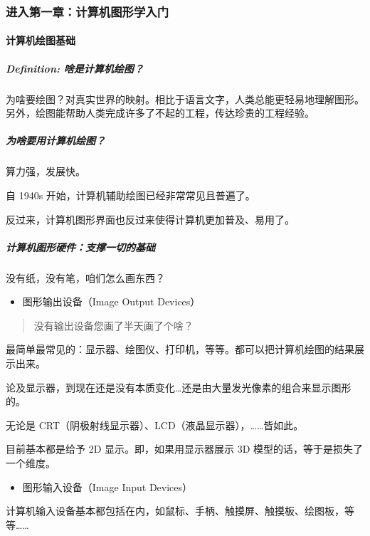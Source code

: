 \documentclass[
]{article}
\begin{document}
\hypertarget{header-n58}{%
\subsubsection{进入第一章：计算机图形学入门}\label{header-n58}}

\hypertarget{header-n59}{%
\paragraph{计算机绘图基础}\label{header-n59}}

\hypertarget{header-n60}{%
\subparagraph{Definition: 啥是计算机绘图？}\label{header-n60}}

为啥要绘图？对真实世界的映射。相比于语言文字，人类总能更轻易地理解图形。
另外，绘图能帮助人类完成许多了不起的工程，传达珍贵的工程经验。

\hypertarget{header-n62}{%
\subparagraph{为啥要用计算机绘图？}\label{header-n62}}

算力强，发展快。

自 1940s 开始，计算机辅助绘图已经非常常见且普遍了。

反过来，计算机图形界面也反过来使得计算机更加普及、易用了。

\hypertarget{header-n66}{%
\subparagraph{计算机图形硬件：支撑一切的基础}\label{header-n66}}

没有纸，没有笔，咱们怎么画东西？

\begin{itemize}
\item
  图形输出设备（Image Output Devices）
\end{itemize}

\begin{quote}
没有输出设备您画了半天画了个啥？
\end{quote}

最简单最常见的：显示器、绘图仪、打印机，等等。都可以把计算机绘图的结果展示出来。

论及显示器，到现在还是没有本质变化\ldots 还是由大量发光像素的组合来显示图形的。

无论是 CRT（阴极射线显示器）、LCD（液晶显示器），\ldots\ldots 皆如此。

目前基本都是给予 2D 显示。即，如果用显示器展示 3D
模型的话，等于是损失了一个维度。

\begin{itemize}
\item
  图形输入设备（Image Input Devices）
\end{itemize}

计算机输入设备基本都包括在内，如鼠标、手柄、触摸屏、触摸板、绘图板，等等\ldots\ldots{}
\end{document}
